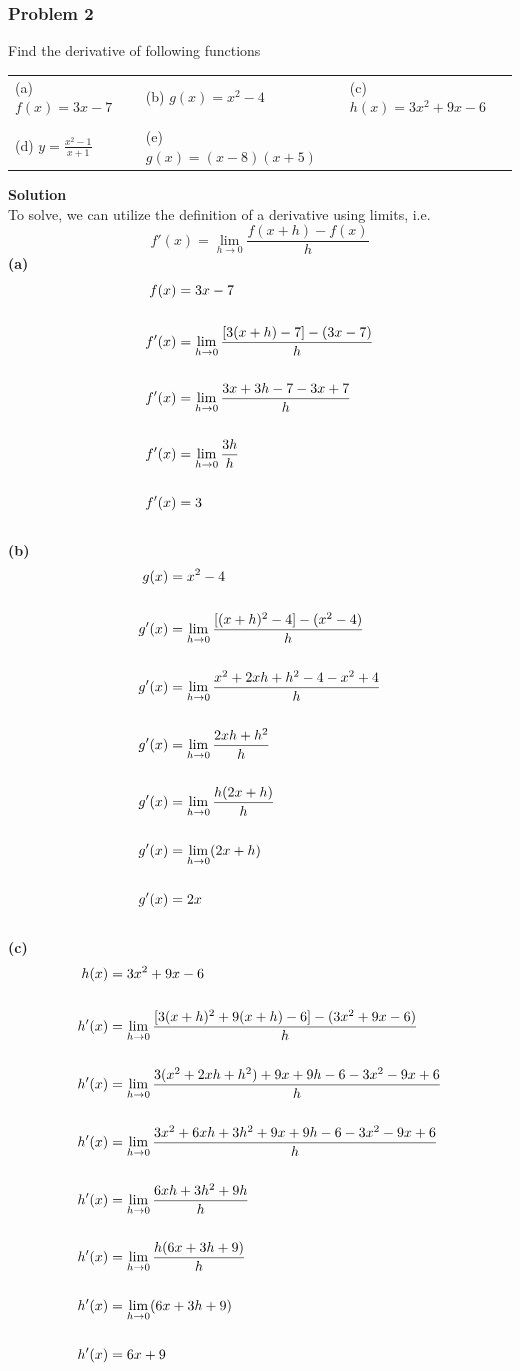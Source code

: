 \documentclass[hidelinks, a4paper, 12pt]{article}
\newcommand{\bd}{\textbf}
\newcommand{\n}{\\[\baselineskip]}
\begin{document}
            \subsubsection{Problem 2}
                Find the derivative of following functions
                \begin{center}
                    \begin{tabularx}{\textwidth} {
                        X X X}
                        (a) $f(x) = 3x-7$ & (b) $g(x) = x^2-4$ & (c) $h(x) = 3x^2+9x-6$\\ 
                        \\
                        (d) $y = \frac{x^2-1}{x+1}$  & (e) $g(x) = (x-8)(x+5)$\\  
                    \end{tabularx}
                \end{center}
                \medskip
                \bd{Solution}\n
                To solve, we can utilize the definition of a derivative using limits, i.e.
                \[f'(x) = \lim_{h\to0} \frac{f(x+h)-f(x)}{h}\]
                \bd{(a)}
                \[\begin{split}
                    f(x) &= 3x-7\n
                    f'(x) &= \lim_{h\to0}\frac{[3(x+h)-7] - (3x-7)}{h}\n 
                    f'(x) &= \lim_{h\to0}\frac{3x + 3h - 7 - 3x + 7}{h}\n
                    f'(x) &= \lim_{h\to0}\frac{3h}{h}\n
                    f'(x) &= 3           
                \end{split}\]
                \n\bd{(b)}
                \[\begin{split}
                    g(x) &= x^2-4\n
                    g'(x) &= \lim_{h\to0}\frac{[(x+h)^2-4] - (x^2-4)}{h}\n 
                    g'(x) &= \lim_{h\to0}\frac{x^2 +2xh + h^2 - 4 - x^2 + 4}{h}\n
                    g'(x) &= \lim_{h\to0}\frac{2xh + h^2}{h}\n
                    g'(x) &= \lim_{h\to0}\frac{h(2x + h)}{h}\n
                    g'(x) &= \lim_{h\to0}(2x+h)\n
                    g'(x) &= 2x           
                \end{split}\]
                \n\bd{(c)}
                \[\begin{split}
                    h(x) &= 3x^2+9x-6\n
                    h'(x) &= \lim_{h\to0}\frac{[3(x+h)^2+9(x+h)-6] - (3x^2+9x-6)}{h}\n
                    h'(x) &= \lim_{h\to0}\frac{3(x^2+2xh+h^2)+9x+9h-6-3x^2-9x+6}{h}\n
                    h'(x) &= \lim_{h\to0}\frac{3x^2+6xh+3h^2+9x+9h-6-3x^2-9x+6}{h}\n
                    h'(x) &= \lim_{h\to0}\frac{6xh+3h^2+9h}{h}\n
                    h'(x) &= \lim_{h\to0}\frac{h(6x+3h+9)}{h}\n
                    h'(x) &= \lim_{h\to0}(6x+3h+9)\n
                    h'(x) &= 6x+9           
                \end{split}\]
\end{document}
